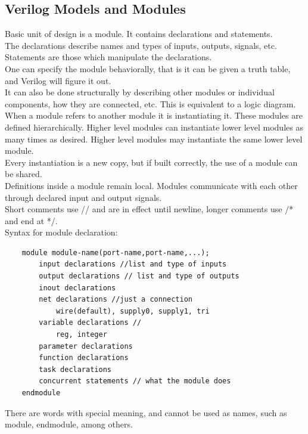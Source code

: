 \documentclass[nobib]{tufte-handout}
\begin{document}
\subsection{Verilog Models and Modules}
Basic unit of design is a module. It contains declarations and statements.\\
The declarations describe names and types of inputs, outputs, signals, etc.\\
Statements are those which manipulate the declarations.\\ One can specify the
module behaviorally, that is it can be given a truth table, and Verilog will
figure it out.\\ It can also be done structurally by describing other modules
or individual components, how they are connected, etc. This is equivalent to a
logic diagram.\\ When a module refers to another module it is instantiating it.
These modules are defined hierarchically. Higher level modules can instantiate
lower level modules as many times as desired. Higher level modules may
instantiate the same lower level module.\\ Every instantiation is a new copy,
but if built correctly, the use of a module can be shared.\\ Definitions inside
a module remain local. Modules communicate with each other through declared
input and output signals.\\ Short comments use // and are in effect until
newline, longer comments use /* and end at */.\\ Syntax for module
declaration:\\
\begin{lstlisting}
    module module-name(port-name,port-name,...);
        input declarations //list and type of inputs
        output declarations // list and type of outputs
        inout declarations
        net declarations //just a connection
            wire(default), supply0, supply1, tri
        variable declarations //
            reg, integer
        parameter declarations
        function declarations
        task declarations
        concurrent statements // what the module does
    endmodule
\end{lstlisting}
There are words with special meaning, and cannot be used as names, such as
module, endmodule, among others.
\end{document}
